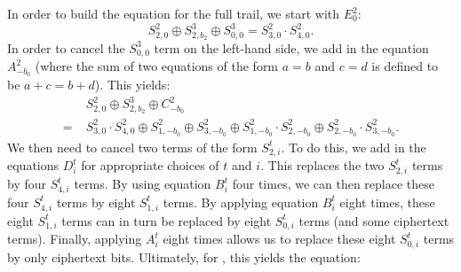 In order to build the equation for the full trail, we start with $E^2_0$:
\[
S^2_{2,0} \oplus S^{3}_{2,b_2} \oplus S^{3}_{0,0} = S^2_{3,0} \cdot S^2_{4,0}.
\]
In order to cancel the $S^{3}_{0,0}$ term on the left-hand side, we add in the equation $A^2_{-b_0}$ (where the sum of two equations of the form $a = b$ and $c = d$ is defined to be $a+c = b+d$). This yields:
\begin{align*}
&S^2_{2,0} \oplus S^3_{2,b_2} \oplus C^2_{-b_0}\\
=\; &S^2_{3,0} \cdot S^2_{4,0} \oplus S^2_{1,-b_0} \oplus S^2_{3,-b_0} \oplus S^2_{1,-b_0} \cdot S^2_{2,-b_0} \oplus S^2_{2,-b_0} \cdot S^2_{3,-b_0}.
\end{align*}
We then need to cancel two terms of the form $S^t_{2,i}$. To do this, we add in the equations $D^t_i$ for appropriate choices of $t$ and $i$. This replaces the two $S^t_{2,i}$ terms by four $S^t_{4,i}$ terms. By using equation $B^t_i$ four times, we can then replace these four $S^t_{4,i}$ terms by eight $S^t_{1,i}$ terms. By applying equation $B^t_i$ eight times, these eight $S^t_{1,i}$ terms can in turn be replaced by eight $S^t_{0,i}$ terms (and some ciphertext terms). Finally, applying $A^t_i$ eight times allows us to replace these eight $S^t_{0,i}$ terms by only ciphertext bits. Ultimately, for \MiniMORUS[1280], this yields the equation:

